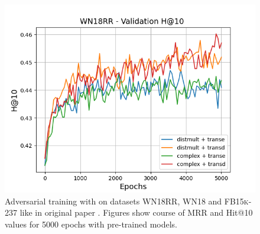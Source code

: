 \begin{figure}
\begin{minipage}{.3\textwidth}
    \end{minipage}%
     \begin{minipage}{.3\textwidth}
      \centering
      \includegraphics[width=0.9\linewidth]{figures/results/gan_train/pretrained/uncertainty/max_distribution/entropy/wn18rr/gan_train_uncertainty_wn18rr_hit10s.png}
    \end{minipage}%
    \caption{Adversarial training with \ussoftmax on datasets \textsc{WN18RR}, \textsc{WN18} and \textsc{FB15k-237} like in original \kbgan paper \cite{cai2017kbgan}.
    Figures show course of MRR and Hit@10 values for 5000 epochs with pre-trained models.}
    \label{fig:test}
\end{figure}